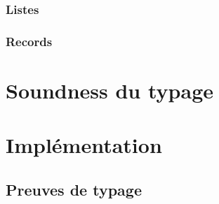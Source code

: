 \documentclass[frenchb]{scrartcl}
\begin{document}
\subsubsection{Listes}

\subsubsection{Records}

\section{Soundness du typage}

\section{Implémentation}

\begin{appendices}
  \section{Preuves de typage}
\end{appendices}



\end{document}
